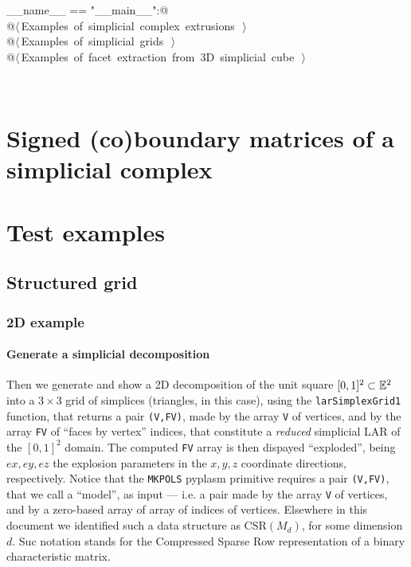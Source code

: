 \documentclass[11pt,oneside]{article}	%
\begin{document}
\begin{flushleft}
\begin{minipage}{\linewidth}
\begin{list}{}{}
\mbox{}\verb@if __name__ == "__main__":@\\
\mbox{}\verb@   @\hbox{$\langle\,$Examples of simplicial complex extrusions\nobreak\ {\footnotesize {}}$\,\rangle$}\verb@@\\
\mbox{}\verb@   @\hbox{$\langle\,$Examples of simplicial grids\nobreak\ {\footnotesize {}}$\,\rangle$}\verb@@\\
\mbox{}\verb@   @\hbox{$\langle\,$Examples of facet extraction from 3D simplicial cube\nobreak\ {\footnotesize {}}$\,\rangle$}\verb@@\\
\mbox{}\verb@@{\NWsep}
\end{list}
\vspace{-2ex}
\end{minipage}\\[4ex]
\end{flushleft}


\section{Signed (co)boundary matrices of a simplicial complex}
\label{simplicial}

\section{Test examples}

\subsection{Structured grid}

\subsubsection{2D example}

\paragraph{Generate a simplicial decomposition}
Then we generate and show a 2D decomposition of the unit square $[0,1]^2\subset\mathbb{E}^2$ into a $3\times 3$ grid of simplices (triangles, in this case), using the \texttt{larSimplexGrid1} function, that returns a pair \texttt{(V,FV)}, made by the array \texttt{V} of vertices, and by the array \texttt{FV} of ``faces by vertex'' indices, that constitute a \emph{reduced} simplicial LAR of the $[0,1]^2$ domain. The computed \texttt{FV} array is then dispayed ``exploded'', being $ex,ey,ez$ the explosion parameters in the $x,y,z$ coordinate directions, respectively. Notice that the \texttt{MKPOLS} pyplasm primitive requires a pair \texttt{(V,FV)}, that we call a ``model'', as input --- i.e. a pair made by the array \texttt{V} of vertices, and by a zero-based array of array of indices of vertices. Elsewhere in this document we identified such a data structure as CSR$(M_d)$, for some dimension $d$. Suc notation stands for the Compressed Sparse Row representation of a binary characteristic matrix.
\end{document}
